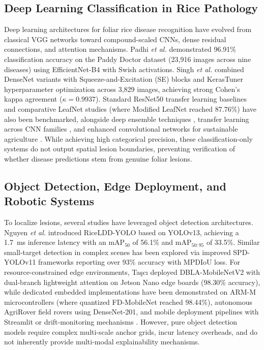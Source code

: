 \documentclass[conference]{IEEEtran}
\begin{document}
\subsection{Deep Learning Classification in Rice Pathology}
Deep learning architectures for foliar rice disease recognition have evolved from classical VGG networks \cite{ref13} toward compound-scaled CNNs, dense residual connections, and attention mechanisms. Padhi \textit{et al.} \cite{ref15} demonstrated 96.91\% classification accuracy on the Paddy Doctor dataset (23,916 images across nine diseases) using EfficientNet-B4 with Swish activations. Singh \textit{et al.} \cite{ref2} combined DenseNet variants with Squeeze-and-Excitation (SE) blocks and KerasTuner hyperparameter optimization across 3,829 images, achieving strong Cohen's kappa agreement ($\kappa = 0.9937$). Standard ResNet50 transfer learning baselines \cite{ref19} and comparative LeafNet studies \cite{ref17} (where Modified LeafNet reached 87.76\%) have also been benchmarked, alongside deep ensemble techniques \cite{ref11}, transfer learning across CNN families \cite{ref10}, and enhanced convolutional networks for sustainable agriculture \cite{ref16}. While achieving high categorical precision, these classification-only systems do not output spatial lesion boundaries, preventing verification of whether disease predictions stem from genuine foliar lesions.

\subsection{Object Detection, Edge Deployment, and Robotic Systems}
To localize lesions, several studies have leveraged object detection architectures. Nguyen \textit{et al.} \cite{ref1} introduced RiceLDD-YOLO based on YOLOv13, achieving a 1.7~ms inference latency with an $\text{mAP}_{50}$ of 56.1\% and $\text{mAP}_{50:95}$ of 33.5\%. Similar small-target detection in complex scenes has been explored via improved SPD-YOLOv11 frameworks \cite{ref12} reporting over 93\% accuracy with MPDIoU loss. For resource-constrained edge environments, Taşcı \cite{ref3} deployed DBLA-MobileNetV2 with dual-branch lightweight attention on Jetson Nano edge boards (98.30\% accuracy), while dedicated embedded implementations have been demonstrated on ARM-M microcontrollers \cite{ref14} (where quantized FD-MobileNet reached 98.44\%), autonomous AgriRover field rovers \cite{ref18} using DenseNet-201, and mobile deployment pipelines with Streamlit \cite{ref9} or drift-monitoring mechanisms \cite{ref8}. However, pure object detection models require complex multi-scale anchor grids, incur latency overheads, and do not inherently provide multi-modal explainability mechanisms.
\end{document}
